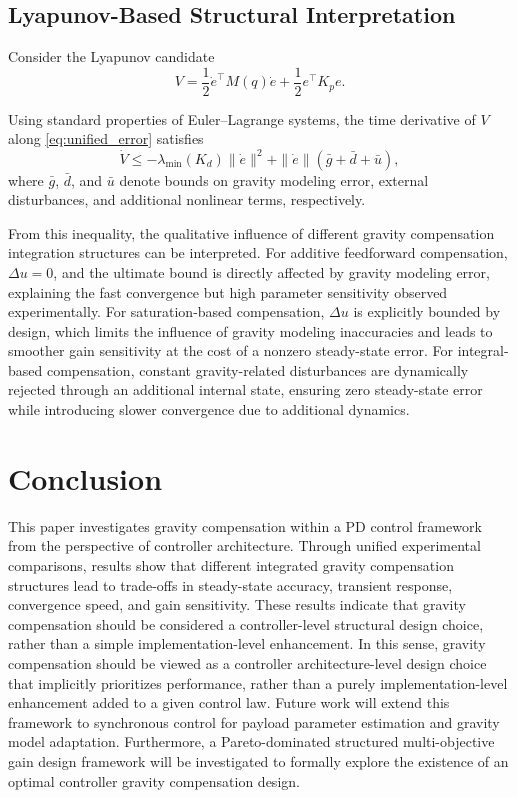 \documentclass[conference]{IEEEtran}
\begin{document}
\subsection{Lyapunov-Based Structural Interpretation}
Consider the Lyapunov candidate
\begin{equation}
	V = \frac{1}{2}\dot e^\top M(q)\dot e
	+ \frac{1}{2} e^\top K_p e .
\end{equation}

Using standard properties of Euler--Lagrange systems, the time derivative of $V$ along \eqref{eq:unified_error} satisfies
\begin{equation}
	\dot V \le - \lambda_{\min}(K_d)\|\dot e\|^2
	+ \|\dot e\|(\bar g + \bar d + \bar u),
\end{equation}
where $\bar g$, $\bar d$, and $\bar u$ denote bounds on gravity modeling error, external disturbances, and additional nonlinear terms, respectively.

From this inequality, the qualitative influence of different gravity compensation integration structures can be interpreted. For additive feedforward compensation, $\Delta u = 0$, and the ultimate bound is directly affected by gravity modeling error, explaining the fast convergence but high parameter sensitivity observed experimentally. For saturation-based compensation, $\Delta u$ is explicitly bounded by design, which limits the influence of gravity modeling inaccuracies and leads to smoother gain sensitivity at the cost of a nonzero steady-state error. For integral-based compensation, constant gravity-related disturbances are dynamically rejected through an additional internal state, ensuring zero steady-state error while introducing slower convergence due to additional dynamics.

\section{Conclusion}
This paper investigates gravity compensation within a PD control framework from the perspective of controller architecture. Through unified experimental comparisons, results show that different integrated gravity compensation structures lead to trade-offs in steady-state accuracy, transient response, convergence speed, and gain sensitivity. These results indicate that gravity compensation should be considered a controller-level structural design choice, rather than a simple implementation-level enhancement. In this sense, gravity compensation should be viewed as a controller architecture-level design choice that implicitly prioritizes performance, rather than a purely implementation-level enhancement added to a given control law. Future work will extend this framework to synchronous control for payload parameter estimation and gravity model adaptation. Furthermore, a Pareto-dominated structured multi-objective gain design framework will be investigated to formally explore the existence of an optimal controller gravity compensation design.
\end{document}
